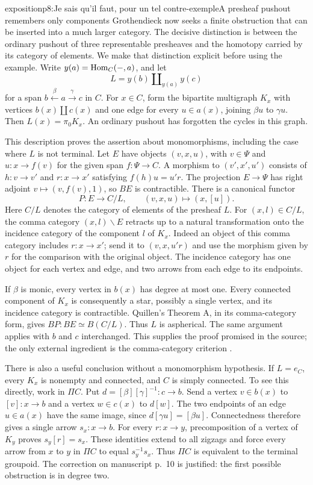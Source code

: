\begin{dcomment}{exposition}{p8:Je sais qu'il faut, pour un tel contre-exemple}{A presheaf pushout remembers only components}
Grothendieck now seeks a finite obstruction that can be inserted into a much larger category. The decisive distinction is between the ordinary pushout of three representable presheaves and the homotopy carried by its category of elements. We make that distinction explicit before using the example. Write $y(a)=\mathrm{Hom}_C(-,a)$, and let
\[
 L=y(b)\amalg_{y(a)}y(c)
\]
for a span $b\xleftarrow{\beta}a\xrightarrow{\gamma}c$ in $C$. For $x\in C$, form the bipartite multigraph $K_x$ with vertices $b(x)\amalg c(x)$ and one edge for every $u\in a(x)$, joining $\beta u$ to $\gamma u$. Then $L(x)=\pi_0K_x$. An ordinary pushout has forgotten the cycles in this graph.

This description proves the assertion about monomorphisms, including the case where $L$ is not terminal. Let $E$ have objects $(v,x,u)$, with $v\in\Psi$ and $u:x\to f(v)$ for the given span $f:\Psi\to C$. A morphism to $(v',x',u')$ consists of $h:v\to v'$ and $r:x\to x'$ satisfying $f(h)u=u'r$. The projection $E\to\Psi$ has right adjoint $v\mapsto(v,f(v),1)$, so $BE$ is contractible. There is a canonical functor
\[
 P:E\longrightarrow C/L,\qquad (v,x,u)\longmapsto(x,[u]).
\]
Here $C/L$ denotes the category of elements of the presheaf $L$. For $(x,l)\in C/L$, the comma category $(x,l)\backslash E$ retracts up to a natural transformation onto the incidence category of the component $l$ of $K_x$. Indeed an object of this comma category includes $r:x\to x'$; send it to $(v,x,u'r)$ and use the morphism given by $r$ for the comparison with the original object. The incidence category has one object for each vertex and edge, and two arrows from each edge to its endpoints.

If $\beta$ is monic, every vertex in $b(x)$ has degree at most one. Every connected component of $K_x$ is consequently a star, possibly a single vertex, and its incidence category is contractible. Quillen's Theorem A, in its comma-category form, gives $BP:BE\simeq B(C/L)$. Thus $L$ is aspherical. The same argument applies with $b$ and $c$ interchanged. This supplies the proof promised in the source; the only external ingredient is the comma-category criterion \citep[\S1, Theorem A]{Quillen1973}.

There is also a useful conclusion without a monomorphism hypothesis. If $L=e_C$, every $K_x$ is nonempty and connected, and $C$ is simply connected. To see this directly, work in $\Pi C$. Put $d=[\beta][\gamma]^{-1}:c\to b$. Send a vertex $v\in b(x)$ to $[v]:x\to b$ and a vertex $w\in c(x)$ to $d[w]$. The two endpoints of an edge $u\in a(x)$ have the same image, since $d[\gamma u]=[\beta u]$. Connectedness therefore gives a single arrow $s_x:x\to b$. For every $r:x\to y$, precomposition of a vertex of $K_y$ proves $s_y[r]=s_x$. These identities extend to all zigzags and force every arrow from $x$ to $y$ in $\Pi C$ to equal $s_y^{-1}s_x$. Thus $\Pi C$ is equivalent to the terminal groupoid. The correction on manuscript p.~10 is justified: the first possible obstruction is in degree two.
\end{dcomment}


